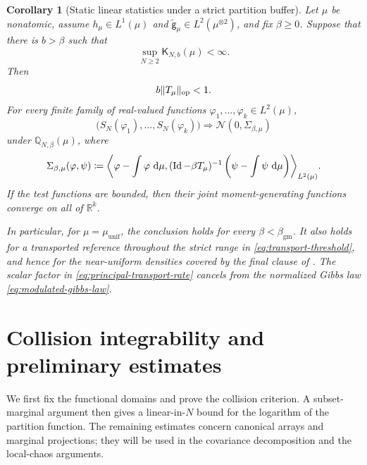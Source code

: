 \documentclass[11pt,reqno]{amsart}
\numberwithin{equation}{section}
\theoremstyle{plain}
\newtheorem{cor}[cor]{Corollary}
\theoremstyle{definition}
\DeclarePairedDelimiter{\norm}{\lVert}{\rVert}
\DeclarePairedDelimiter{\ip}{\langle}{\rangle}
\newcommand{\dd}{\mathop{}\!\mathrm d}
\newcommand{\R}{\mathbb R}
\newcommand{\Q}{\mathbb Q}
\newcommand{\Id}{\operatorname{Id}}
\newcommand{\op}{\mathrm{op}}
\newcommand{\be}{\beta}
\newcommand{\g}{\mathsf g}
\newcommand{\K}{\mathsf K}
\newcommand{\tl}{\widetilde}
\newcommand{\muunif}{\mu_{\mathrm{unif}}}
\newcommand{\gm}{\mathrm{gm}}
\begin{document}
\begin{cor}[Static linear statistics under a strict partition buffer]
\label{cor:static-clt}
Let $\mu$ be nonatomic, assume $h_{\mu}\in L^1(\mu)$ and $\tl{\g}_{\mu}\in L^2(\mu^{\otimes2})$, and fix $\be\geq0$.  Suppose that there is $b>\be$ such that
\begin{equation}
 \sup_{N\geq2}\K_{N,b}(\mu)<\infty.
 \label{eq:clt-buffer}
\end{equation}
Then
\begin{equation}
 b\norm{T_{\mu}}_{\op}<1.
 \label{eq:clt-spectral-gap}
\end{equation}
For every finite family of real-valued functions $\varphi_1,\ldots,\varphi_k\in L^2(\mu)$,
\begin{equation}
 \bigl(S_N(\varphi_1),\ldots,S_N(\varphi_k)\bigr)
 \Longrightarrow\mathcal N(0,\Sigma_{\be,\mu})
 \label{eq:static-vector-clt}
\end{equation}
under $\Q_{N,\be}(\mu)$, where
\begin{equation}
 \Sigma_{\be,\mu}(\varphi,\psi)
 \coloneqq\ip*{\varphi-\int\varphi\,\dd\mu,
 (\Id-\be T_{\mu})^{-1}
 \left(\psi-\int\psi\,\dd\mu\right)}_{L^2(\mu)}.
 \label{eq:static-clt-covariance}
\end{equation}
If the test functions are bounded, then their joint moment-generating functions converge on all of $\R^k$.

In particular, for $\mu=\muunif$, the conclusion holds for every $\be<\beta_{\gm}$.  It also holds for a transported reference throughout the strict range in \eqref{eq:transport-threshold}, and hence for the near-uniform densities covered by the final clause of .  The scalar factor in \eqref{eq:principal-transport-rate} cancels from the normalized Gibbs law \eqref{eq:modulated-gibbs-law}.
\end{cor}


\section{Collision integrability and preliminary estimates}

\label{sec:collisions-preliminaries}

We first fix the functional domains and prove the collision criterion. A subset-marginal argument then gives a linear-in-$N$ bound for the logarithm of the partition function. The remaining estimates concern canonical arrays and marginal projections; they will be used in the covariance decomposition and the local-chaos arguments.
\end{document}
